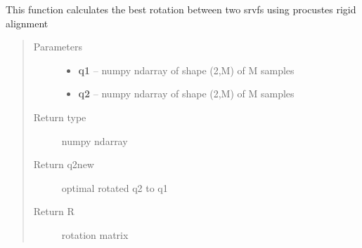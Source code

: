 \documentclass[letterpaper,10pt,english]{sphinxmanual}
\begin{document}

\begin{fulllineitems}
\label{curve_functions:curve_functions.find_best_rotation}
This function calculates the best rotation between two srvfs using
procustes rigid alignment
\begin{quote}\begin{description}
\item[{Parameters}] \leavevmode\begin{itemize}
\item {} 
\textbf{q1} -- numpy ndarray of shape (2,M) of M samples

\item {} 
\textbf{q2} -- numpy ndarray of shape (2,M) of M samples

\end{itemize}

\item[{Return type}] \leavevmode
numpy ndarray

\item[{Return q2new}] \leavevmode
optimal rotated q2 to q1

\item[{Return R}] \leavevmode
rotation matrix

\end{description}\end{quote}

\end{fulllineitems}

\end{document}
